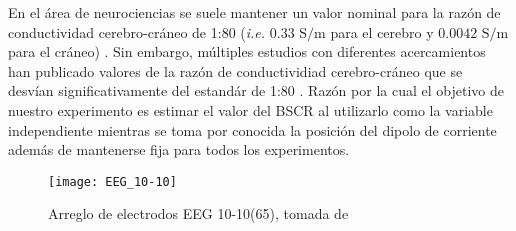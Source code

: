 En el área de neurociencias se suele mantener un valor nominal para la razón de conductividad cerebro-cráneo de 1:80 (\emph{i.e.} $0.33\text{ S/m}$ para el cerebro y $0.0042 \text{ S/m}$ para el cráneo) \cite{Rush1968,Rush1969,Cohen1983}.
Sin embargo, múltiples estudios con diferentes acercamientos han publicado valores de la razón de conductividiad cerebro-cráneo que se desvían significativamente del estandár de 1:80 \cite{McCann2019}.
Razón por la cual el objetivo de nuestro experimento es estimar el valor del BSCR al utilizarlo como la variable independiente mientras se toma por conocida la posición del dipolo de corriente además de mantenerse fija para todos los experimentos.

\begin{figure}[tb]
	\centering
	\texttt{[image: EEG\_10-10]}
	\caption{Arreglo de electrodos EEG 10-10(65), tomada de \cite{krolEnglishEEGElectrode2020}}
	\label{fig:EEG10-10}
\end{figure}

